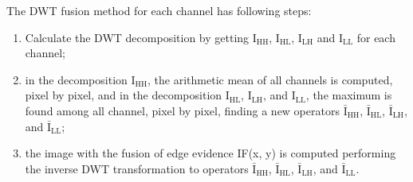 \documentclass[journal]{IEEEtran}
\begin{document}
The DWT fusion method for each channel has following steps:
\begin{enumerate}
\item Calculate the DWT decomposition by getting $\text{I}_\text{HH}$, $\text{I}_\text{HL}$, $\text{I}_\text{LH}$ and $\text{I}_\text{LL}$ for each channel;
\item in the decomposition $\text{I}_\text{HH}$, the arithmetic mean of all channels is computed, pixel by pixel, and in the decomposition $\text{I}_\text{HL}$, $\text{I}_\text{LH}$, and $\text{I}_\text{LL}$, the maximum is found among all channel, pixel by pixel, finding a new operators $\bar{\text{I}}_\text{HH}$, $\bar{\text{I}}_\text{HL}$, $\bar{\text{I}}_\text{LH}$, and $\bar{\text{I}}_\text{LL}$;
\item the image with the fusion of edge evidence IF(x, y) is computed performing the inverse DWT transformation to operators $\bar{\text{I}}_\text{HH}$, $\bar{\text{I}}_\text{HL}$, $\bar{\text{I}}_\text{LH}$, and $\bar{\text{I}}_\text{LL}$.
\end{enumerate}
\end{document}
